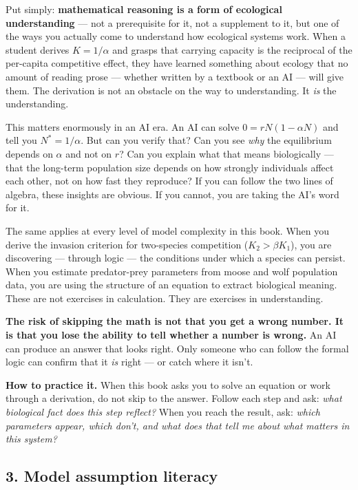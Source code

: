 \documentclass[
  letterpaper,
  DIV=11,
  numbers=noendperiod]{scrreprt}
\begin{document}
Put simply: \textbf{mathematical reasoning is a form of ecological
understanding} --- not a prerequisite for it, not a supplement to it,
but one of the ways you actually come to understand how ecological
systems work. When a student derives \(K = 1/\alpha\) and grasps that
carrying capacity is the reciprocal of the per-capita competitive
effect, they have learned something about ecology that no amount of
reading prose --- whether written by a textbook or an AI --- will give
them. The derivation is not an obstacle on the way to understanding. It
\emph{is} the understanding.

This matters enormously in an AI era. An AI can solve
\(0 = rN(1 - \alpha N)\) and tell you \(N^* = 1/\alpha\). But can you
verify that? Can you see \emph{why} the equilibrium depends on
\(\alpha\) and not on \(r\)? Can you explain what that means
biologically --- that the long-term population size depends on how
strongly individuals affect each other, not on how fast they reproduce?
If you can follow the two lines of algebra, these insights are obvious.
If you cannot, you are taking the AI's word for it.

The same applies at every level of model complexity in this book. When
you derive the invasion criterion for two-species competition
(\(K_2 > \beta K_1\)), you are discovering --- through logic --- the
conditions under which a species can persist. When you estimate
predator-prey parameters from moose and wolf population data, you are
using the structure of an equation to extract biological meaning. These
are not exercises in calculation. They are exercises in understanding.

\textbf{The risk of skipping the math is not that you get a wrong
number. It is that you lose the ability to tell whether a number is
wrong.} An AI can produce an answer that looks right. Only someone who
can follow the formal logic can confirm that it \emph{is} right --- or
catch where it isn't.

\textbf{How to practice it.} When this book asks you to solve an
equation or work through a derivation, do not skip to the answer. Follow
each step and ask: \emph{what biological fact does this step reflect?}
When you reach the result, ask: \emph{which parameters appear, which
don't, and what does that tell me about what matters in this system?}

\subsection{3. Model assumption
literacy}\label{model-assumption-literacy}
\end{document}
